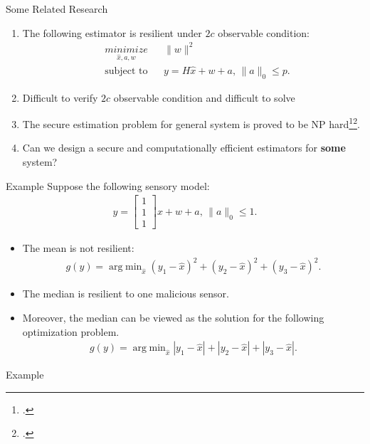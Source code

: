 \documentclass[10pt]{beamer}
\DeclareMathOperator{\argmin}{arg\;min}
\begin{document}
\begin{frame}{Some Related Research}
  \begin{enumerate}
  \item The following estimator is resilient under $2c$ observable condition:
    \begin{align*}
      & \mathop{\textit{minimize}}\limits_{\hat x,a,w}&
      & \|w\|^2 \\
      &\text{subject to}&
      &y = H \hat x + w + a,\,\|a\|_0\leq p.
    \end{align*}
  \item Difficult to verify $2c$ observable condition and difficult to solve
\item The secure estimation problem for general system is proved to be NP hard\footcite{Hendrickx2014}\footcite{Mao2019}.
  \item Can we design a secure and computationally efficient estimators for {\bf some} system?
  \end{enumerate}
\end{frame}

\begin{frame}{Example}
  Suppose the following sensory model:
  \begin{align*}
    y = \begin{bmatrix}
      1\\
      1\\
      1
    \end{bmatrix}x + w+a,\,\|a\|_0\leq 1.
  \end{align*}
  \begin{itemize}
   \item The mean is not resilient: 
  \begin{align*}
    g(y) = \argmin_{\hat x}  (y_1-\hat x)^2+(y_2-\hat x)^2+(y_3-\hat x)^2.
  \end{align*}
    \item The median is resilient to one malicious sensor.
    \item Moreover, the median can be viewed as the solution for the following optimization problem. 
  \begin{align*}
    g(y) = \argmin_{\hat x}  |y_1-\hat x|+|y_2-\hat x|+|y_3-\hat x|.
  \end{align*}
  \end{itemize}
\end{frame}

\begin{frame}{Example}
  \begin{figure}[ht]
    \centering
  \end{figure}
\end{frame}
\end{document}
